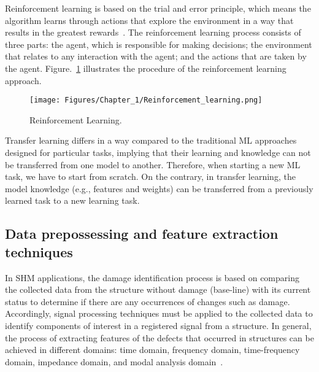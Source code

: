 Reinforcement learning is based on the trial and error principle, which means the algorithm learns through actions that explore the environment in a way that results in the greatest rewards~\cite{Russell2010}.
The reinforcement learning process consists of three parts: the agent, which is responsible for making decisions; the environment that relates to any interaction with the agent; and the actions that are taken by the agent. 
Figure.~\ref{fig:ReinforcementLearning} illustrates the procedure of the reinforcement learning approach.
\begin{figure} [!ht]
	\begin{center}
		\centering
		\texttt{[image: Figures/Chapter\_1/Reinforcement\_learning.png]}
	\end{center}
	\caption{Reinforcement Learning.} 
	\label{fig:ReinforcementLearning}
\end{figure}

Transfer learning differs in a way compared to the traditional ML approaches designed for particular tasks, implying that their learning and knowledge can not be transferred from one model to another.
Therefore, when starting a new ML task, we have to start from scratch.
On the contrary, in transfer learning, the model knowledge (e.g., features and weights) can be transferred from a previously learned task to a new learning task.
\subsection[Data prepossessing and FE]{Data prepossessing and feature extraction techniques}		

In SHM applications, the damage identification process is based on comparing the collected data from the structure without damage (base-line) with its current status to determine if there are any occurrences of changes such as damage.
Accordingly, signal processing techniques must be applied to the collected data to identify components of interest in a registered signal from a structure.
In general, the process of extracting features of the defects that occurred in structures can be achieved in different domains: time domain, frequency domain, time-frequency domain, impedance domain, and modal analysis domain~\cite{Khan2019}.

